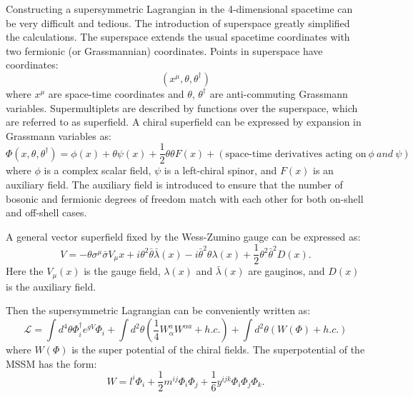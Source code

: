 \documentclass[thesis.tex]{subfiles}
\begin{document}
Constructing a supersymmetric Lagrangian in the 4-dimensional spacetime can be very difficult and tedious. 
The introduction of superspace greatly simplified the calculations. 
The superspace extends the usual spacetime coordinates with two fermionic (or Grassmannian) coordinates. 
Points in superspace have coordinates:
     \begin{equation}
	(x^\mu, \theta, \theta^\dagger)
     \end{equation}
where $x^\mu$ are space-time coordinates and $\theta$, $\theta^\dagger$ are anti-commuting Grassmann variables.
Supermultiplets are described by functions over the superspace, which are referred to as superfield. 
A chiral superfield can be expressed by expansion in Grassmann variables as:
    \begin{equation}
    \Phi(x, \theta, \theta^\dagger) = \phi(x) + \theta\psi(x) + \frac{1}{2}\theta\theta F(x) + (\text{space-time derivatives acting on}\ \phi \ {and}\  \psi)
    \end{equation}
 where $\phi$ is a complex scalar field, $\psi$ is a left-chiral spinor, and $F(x)$ is an auxiliary field. 
 The auxiliary field is introduced to ensure that the number of bosonic and fermionic degrees of freedom match with each other for both on-shell and off-shell cases. 
 
 A general vector superfield fixed by the Wess-Zumino gauge can be expressed as: 
 	\begin{equation}
		V = -\theta \sigma^\mu \bar{\sigma}V_\mu{x} + i\theta^2 \bar{\theta}\bar{\lambda}(x) -  i\bar{\theta}^2 \theta\lambda(x) + \frac{1}{2}\theta^2 \bar{\theta}^2 D(x).
	\end{equation}
Here the $V_\mu(x)$ is the gauge field, $\lambda(x)$ and $\bar{\lambda}(x)$ are gauginos, and $D(x)$ is the auxiliary field. 

Then the supersymmetric Lagrangian can be conveniently written as: 
	\begin{equation}
		\mathcal{L} = \int d^4\theta \Phi_i^\dagger e^{gV}\Phi_i + \int d^2\theta (\frac{1}{4}W_\alpha^a W^{\alpha a} + h.c.) + \int d^2\theta (W(\Phi) + h.c.)
		 \label{eq:SUSYL}
	\end{equation}
where $W(\Phi)$ is the super potential of the chiral fields. The superpotential of the MSSM has the form: 
	\begin{equation}
		W = 	l^i\Phi_i + \frac{1}{2}m^{ij} \Phi_i \Phi_j + \frac{1}{6} y^{ijk} \Phi_i \Phi_j \Phi_k.
	\end{equation}
	
\end{document}
